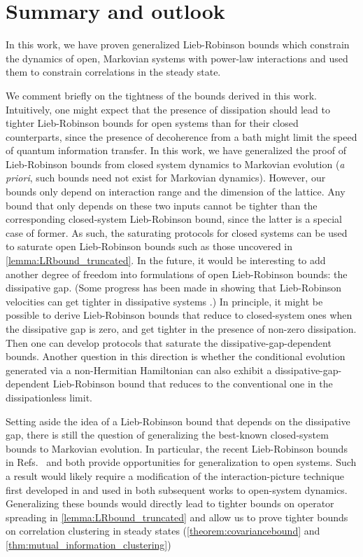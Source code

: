 \section{Summary and outlook}

In this work, we have proven generalized Lieb-Robinson bounds which constrain the dynamics of open, Markovian systems with power-law interactions and used them to constrain correlations in the steady state.

We comment briefly on the tightness of the bounds derived in this work. Intuitively, one might expect that the presence of dissipation should lead to tighter Lieb-Robinson bounds for open systems than for their closed counterparts, since the presence of decoherence from a bath might  limit the speed of quantum information transfer.
In this work, we have  generalized the proof of Lieb-Robinson bounds from closed system dynamics to Markovian evolution (\textit{a priori}, such bounds need not exist for Markovian dynamics).
However, our bounds only depend on interaction range and the dimension of the lattice.
Any bound that only depends on these two inputs cannot be tighter than the corresponding closed-system Lieb-Robinson bound, since the latter is a special case of former.
As such, the saturating protocols for closed systems \cite{Tran2020hierarchylinearlightcones,Tran2021} can be used to saturate open Lieb-Robinson bounds such as those uncovered in  \cref{lemma:LRbound_truncated}.
In the future, it would be interesting to add another degree of freedom into formulations of open Lieb-Robinson bounds: the dissipative gap. (Some progress has been made in showing that Lieb-Robinson velocities can get tighter in dissipative systems \cite{descamps2013}.)
In principle, it might be possible to derive Lieb-Robinson bounds that reduce to closed-system ones when the dissipative gap is zero, and get tighter in the presence of non-zero dissipation.
Then one can develop protocols that saturate the dissipative-gap-dependent bounds.
Another question in this direction is whether the conditional evolution generated via a non-Hermitian Hamiltonian can also exhibit a dissipative-gap-dependent Lieb-Robinson bound that reduces to the conventional one in the dissipationless limit.

Setting aside the idea of a Lieb-Robinson bound that depends on the dissipative gap, there is still the question of generalizing the best-known closed-system bounds to Markovian evolution. In particular, the recent Lieb-Robinson bounds in Refs.~\cite{kuwaharaStrictlyLinearLight2020} and \cite{Tran2021b} both provide opportunities for generalization to open systems.
Such a result would likely require a modification of the interaction-picture technique first developed in \cite{Foss-Feig2015} and used in both subsequent works to open-system dynamics.
Generalizing these bounds would directly lead to tighter bounds on operator spreading in \cref{lemma:LRbound_truncated} and allow us to prove tighter bounds on correlation clustering in steady states (\cref{theorem:covariancebound} and \cref{thm:mutual_information_clustering})

